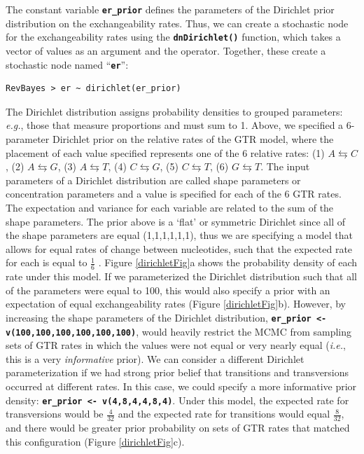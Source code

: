 \documentclass[11pt]{article}
\newcommand{\cl}[1]{{\texttt{\textbf{#1}}}}
\newcommand{\rbdn}{{\Large \symbol{126}}} %
\begin{document}
The constant variable \cl{er\_prior} defines the parameters of the Dirichlet prior distribution on the exchangeability rates. Thus, we can create a stochastic node for the exchangeability rates using the \cl{dnDirichlet()} function, which takes a vector of values as an argument and the \cl{\rbdn} operator. Together, these create a stochastic node named ``\cl{er}'': 

{\tt \begin{snugshade*}
\begin{lstlisting}
RevBayes > er ~ dirichlet(er_prior)
\end{lstlisting}
\end{snugshade*}}

The Dirichlet distribution assigns probability densities to grouped parameters: {\it e.g.}, those that measure proportions and must sum to 1. 
Above, we specified a 6-parameter Dirichlet prior on the relative rates of the GTR model, where the placement of each value specified represents one of the 6 relative rates: (1) $A\leftrightarrows C$, (2) $A\leftrightarrows G$, (3) $A\leftrightarrows T$, (4) $C\leftrightarrows G$, (5) $C\leftrightarrows T$, (6) $G\leftrightarrows T$. 
The input parameters of a Dirichlet distribution are called shape parameters or concentration parameters and a value is specified for each of the 6 GTR rates. 
The expectation and variance for each variable are related to the sum of the shape parameters.
The prior above is a `flat' or symmetric Dirichlet since all of the shape parameters are equal (1,1,1,1,1,1), thus we are specifying a model that allows for equal rates of change between nucleotides, such that the expected rate for each is equal to $\frac{1}{6}$ \citep{zwickl04}.
Figure \ref{dirichletFig}a shows the probability density of each rate under this model.
If we parameterized the Dirichlet distribution such that all of the parameters were equal to 100, this would also specify a prior with an expectation of equal exchangeability rates (Figure \ref{dirichletFig}b). 
However, by increasing the shape parameters of the Dirichlet distribution, \cl{er\_prior <- v(100,100,100,100,100,100)}, would heavily restrict the MCMC from sampling sets of GTR rates in which the values were not equal or very nearly equal ({\it i.e.}, this is a very {\em informative} prior). 
We can consider a different Dirichlet parameterization if we had strong prior belief that transitions and transversions occurred at different rates.
In this case, we could specify a more informative prior density: \cl{er\_prior <- v(4,8,4,4,8,4)}. 
Under this model, the expected rate for transversions would be $\frac{4}{32}$ and the expected rate for transitions would equal $\frac{8}{32}$, and there would be greater prior probability on sets of GTR rates that matched this configuration (Figure \ref{dirichletFig}c). 
\end{document}
